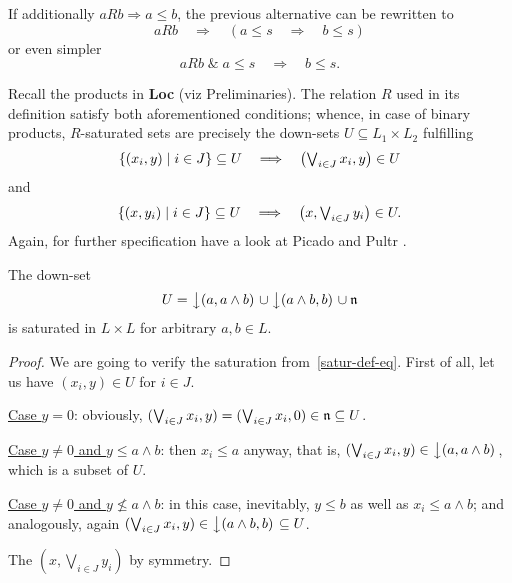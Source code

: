 \begin{rem} \label{satur-def-eq}
  If additionally $aRb \Rightarrow a \leq b$, the previous alternative can be
  rewritten to
  \[
    aRb \quad \Rightarrow \quad (a \leq s \quad \Rightarrow \quad b \leq s)
  \]
  or even simpler
  \[
    aRb \; \& \; a \leq s \quad \Longrightarrow \quad b \leq s.
  \]

  Recall the products in {\bf Loc} (viz Preliminaries).
  The relation $R$ used in its definition satisfy both aforementioned
  conditions;
  whence, in case of binary products, $R$-saturated sets are precisely the
  down-sets $U \subseteq L_1 \times L_2$ fulfilling 
  \[
    \textstyle
    \{ (x_i, y) \mid i \in J \} \subseteq U \quad \Longrightarrow \quad
    \left(\bigvee_{i\in J} x_i, y\right)\in U
  \]
  and
  \[
    \textstyle
    \{ (x, y_i) \mid i \in J \} \subseteq U \quad \Longrightarrow \quad \left(x,
    \bigvee_{i\in J} y_i\right)\in U.
  \]
  Again, for further specification have a look at Picado and Pultr
  \cite{picado-pultr12}.
\end{rem}

\begin{lem} \label{downsets-satur}
  The down-set
  \[
    U = \left\downarrow(a, a \wedge b)\right. \cup \left\downarrow(a \wedge b, b)\right. \cup \mathfrak{n}
  \]
  is saturated in $L \times L$ for arbitrary $a, b\in L$.
\end{lem}
\begin{proof}
  We are going to verify the saturation from~\ref{satur-def-eq}\thinspace.
  First of all, let us have $(x_i, y)\in U$ for $i\in J$.

  \underline{Case $y = 0$}:
  obviously, $(\bigvee_{i\in J} x_i, y) = (\bigvee_{i\in J} x_i, 0)\in \mathfrak{n}
  \subseteq U$.

  \underline{Case $y \ne 0$ and $y \leq a \wedge b$}:
  then $x_i \leq a$ anyway, that is, $(\bigvee_{i\in J} x_i, y) \in
  \left\downarrow(a, a \wedge b)\right.$, which is a subset of $U$.

  \underline{Case $y \ne 0$ and $y \not\leq a \wedge b$}:
  in this case, inevitably, $y \leq b$ as well as $x_i \leq a \wedge b$; and
  analogously, again $(\bigvee_{i\in J} x_i, y) \in \left\downarrow(a \wedge b,
  b)\right. \subseteq U$.

  The $(x, \bigvee_{i\in J} y_i)$ by symmetry.
\end{proof}

